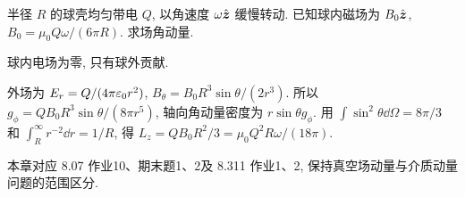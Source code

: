 \begin{example}
半径 $R$ 的球壳均匀带电 $Q$, 以角速度 $\omega\hat{\boldsymbol{z}}$ 缓慢转动. 已知球内磁场为 $B_0\hat{\boldsymbol{z}}$, $B_0=\mu_0Q\omega/(6\pi R)$. 求场角动量.
\end{example}
\begin{solution}
球内电场为零, 只有球外贡献.

外场为 $E_r=Q/(4\pi\varepsilon_0 r^2)$, $B_\theta=B_0R^3\sin\theta/(2r^3)$. 所以 $g_\phi=QB_0R^3\sin\theta/(8\pi r^5)$, 轴向角动量密度为 $r\sin\theta g_\phi$. 用 $\int\sin^2\theta\dd\Omega=8\pi/3$ 和 $\int_R^\infty r^{-2}\dd r=1/R$, 得
$L_z=QB_0R^2/3=\mu_0Q^2R\omega/(18\pi)$.
\end{solution}


本章对应 8.07 作业10、期末题1、2及 8.311 作业1、2, 保持真空场动量与介质动量问题的范围区分.
